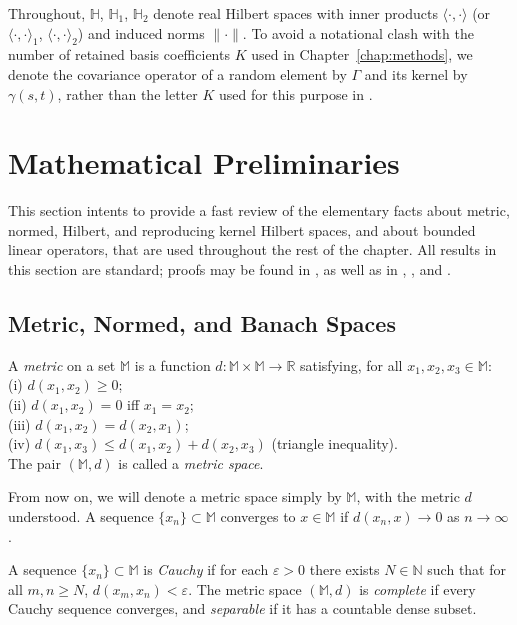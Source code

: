 Throughout, $\mathbb{H}$, $\mathbb{H}_1$, $\mathbb{H}_2$ denote real Hilbert
spaces with inner products $\langle\cdot,\cdot\rangle$ (or
$\langle\cdot,\cdot\rangle_1$, $\langle\cdot,\cdot\rangle_2$) and induced
norms $\|\cdot\|$. To avoid a notational clash with the number of retained
basis coefficients $K$ used in Chapter~\ref{chap:methods}, we denote the
covariance operator of a random element by $\Gamma$ and its kernel by
$\gamma(s,t)$, rather than the letter $K$ used for this purpose in
\cite{hsingeubank2015}.

\section{Mathematical Preliminaries}
\label{sec:preliminaries}

This section intents to provide a fast review of the elementary facts about metric,
normed, Hilbert, and reproducing kernel Hilbert spaces, and about bounded
linear operators, that are used throughout the rest of the chapter. All
results in this section are standard; proofs may be found in
\cite{hsingeubank2015}, as well as in \cite{kreyszig1978introductory}, \cite{mayorga2025course}, and \cite{brezis2011functional}.

\subsection{Metric, Normed, and Banach Spaces}

\begin{definition}
A \emph{metric} on a set $\mathbb{M}$ is a function $d:\mathbb{M}\times
\mathbb{M}\to\mathbb{R}$ satisfying, for all $x_1,x_2,x_3\in\mathbb{M}$:\\
(i) $d(x_1,x_2)\geq 0$;\\ 
(ii) $d(x_1,x_2)=0$ iff $x_1=x_2$;\\
(iii) $d(x_1,x_2) = d(x_2,x_1)$; \\
(iv) $d(x_1,x_3)\leq d(x_1,x_2)+d(x_2,x_3)$ (triangle inequality). \\
The pair $(\mathbb{M},d)$ is called a \emph{metric space}. 
\end{definition}
From now on, we will denote a metric space simply by $\mathbb{M}$, with the metric $d$ understood. A sequence $\{x_n\}\subset\mathbb{M}$ converges to $x\in\mathbb{M}$ if $d(x_n,x)\to 0$ as $n\to\infty$.
\begin{definition}
A sequence $\{x_n\}\subset\mathbb{M}$ is \emph{Cauchy} if for each $\varepsilon>0$ there exists $N\in\mathbb{N}$ such that for all $m,n\ge N$, $d(x_m,x_n)<\varepsilon$. The metric space $(\mathbb{M},d)$ is \emph{complete} if every Cauchy sequence converges, and \emph{separable} if it has a countable dense subset.
\end{definition}

